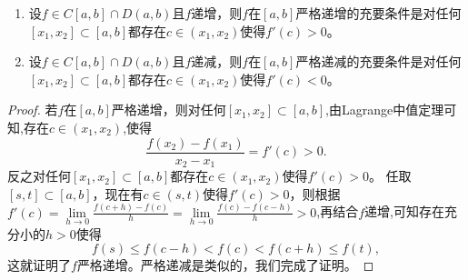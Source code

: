 \documentclass[../../main.tex]{subfiles}%
\begin{document}
\begin{theorem}[严格单调和导数的关系]\label{theorem:严格单调和导数的关系}
\begin{enumerate}
\item 设\(f\in C[a,b]\cap D(a,b)\)且\(f\)递增，则\(f\)在\([a,b]\)严格递增的充要条件是对任何\([x_1,x_2]\subset [a,b]\)都存在\(c\in(x_1,x_2)\)使得\(f'(c)>0\)。

\item 设\(f\in C[a,b]\cap D(a,b)\)且\(f\)递减，则\(f\)在\([a,b]\)严格递减的充要条件是对任何\([x_1,x_2]\subset [a,b]\)都存在\(c\in(x_1,x_2)\)使得\(f'(c)<0\)。
\end{enumerate}
\end{theorem}
\begin{proof}

若\(f\)在\([a,b]\)严格递增，则对任何\([x_1,x_2]\subset [a,b]\),由Lagrange中值定理可知,存在\(c\in(x_1,x_2)\),使得
\[
\frac{f(x_2)-f(x_1)}{x_2 - x_1}=f'(c)>0.
\]
反之对任何\([x_1,x_2]\subset [a,b]\)都存在\(c\in(x_1,x_2)\)使得\(f'(c)>0\)。
任取\([s,t]\subset [a,b]\)，现在有\(c\in(s,t)\)使得\(f'(c)>0\)，则根据$f'\left( c \right) =\underset{h\rightarrow 0}{\lim}\frac{f\left( c+h \right) -f\left( c \right)}{h}=\underset{h\rightarrow 0}{\lim}\frac{f\left( c \right) -f\left( c-h \right)}{h}>0$,再结合$f$递增,可知存在充分小的\(h > 0\)使得
\[
f(s)\leqslant f(c - h)<f(c)<f(c + h)\leqslant f(t),
\]
这就证明了\(f\)严格递增。严格递减是类似的，我们完成了证明。

\end{proof}
\end{document}
